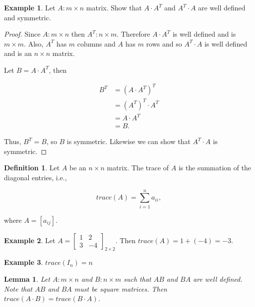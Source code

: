 \documentclass[12pt]{article}
\newtheorem*{lemma}{Lemma}
\theoremstyle{definition}
\newtheorem*{definition}{Definition}
\newtheorem*{example}{Example}
\begin{document}
\begin{example}
Let $A : m \times n$ matrix. Show that $A \cdot A^T$ and $A^T \cdot A$ are well defined and symmetric.

\begin{proof}
Since $A : m \times n$ then $A^T : n \times m$. Therefore $A \cdot A^T$ is well defined and is $m \times m$.
Also, $A^T$ has $m$ columns and $A$ has $m$ rows and so $A^T \cdot A$ is well defined and is an
$n \times n$ matrix.

Let $B = A \cdot A^T$, then

\begin{align*}
B^T &= (A \cdot A^T)^T \\
&= (A^T)^T \cdot A^T \\
&= A \cdot A^T \\
&= B.
\end{align*}

Thus, $B^T = B$, so $B$ is symmetric. Likewise we can show that $A^T \cdot A$ is symmetric.
\end{proof}
\end{example}

\begin{definition}
Let $A$ be an $n \times n$ matrix. The trace of $A$ is the summation of the diagonal entries, i.e.,

\[
trace(A) = \sum^{n}_{i = 1} a_{ii},
\]

where $A = [a_{ij}]$.
\end{definition}

\begin{example}
Let $A = \begin{bmatrix} 1 & 2 \\ 3 & -4 \end{bmatrix}_{2 \times 2}$. Then $trace(A) = 1 + (-4) = -3$.
\end{example}

\begin{example}
$trace(I_n) = n$
\end{example}

\begin{lemma}
Let $A : m \times n$ and $B : n \times m$ such that $AB$ and $BA$ are well defined. Note that $AB$ and $BA$
must be square matrices. Then $trace(A \cdot B) = trace(B \cdot A)$.
\end{lemma}
\end{document}
